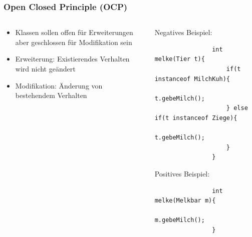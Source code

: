 \begin{frame}[fragile]
	\frametitle{Open Closed Principle (OCP)}
	\begin{columns}
		\begin{column}{0.5\textwidth}
			\small
			\begin{itemize}
			  \item Klassen sollen offen f\"ur Erweiterungen
			  aber geschlossen f\"ur Modifikation sein
			  \item Erweiterung: Existierendes Verhalten wird nicht ge\"andert
			  \item Modifikation: \"Anderung von bestehendem Verhalten
			\end{itemize}
		\end{column}
		\begin{column}{0.5\textwidth}
			Negatives Beispiel:
			\begin{lstlisting}
				int melke(Tier t){
					if(t instanceof MilchKuh){
						t.gebeMilch();
					} else if(t instanceof Ziege){
						t.gebeMilch();
					}
				}
			\end{lstlisting}
			Positives Beispiel:
			\begin{lstlisting}
				int melke(Melkbar m){
					m.gebeMilch();
				}
			\end{lstlisting}
		\end{column}
	\end{columns}
\end{frame}  

